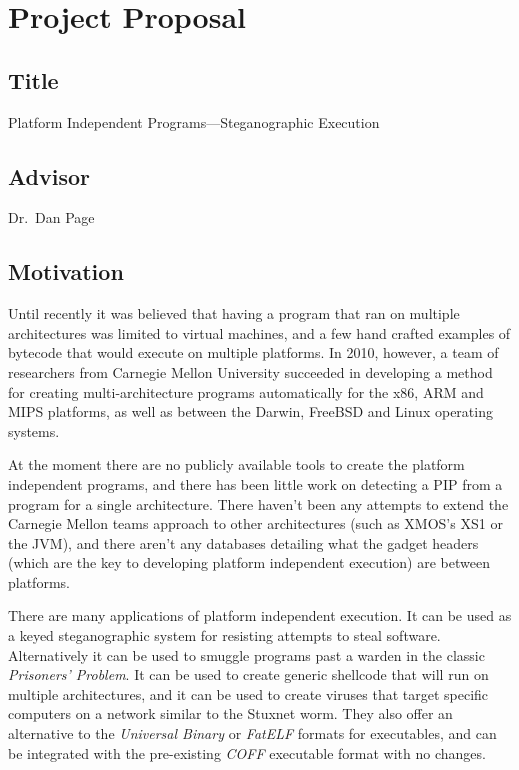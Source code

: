 \documentclass{article}
\begin{document}
\section{Project Proposal}

\subsection{Title}

Platform Independent Programs---Steganographic Execution

\subsection{Advisor}

Dr.~Dan Page

\subsection{Motivation}

Until recently it was believed that having a program that ran on
multiple architectures was limited to virtual machines, and a few hand
crafted examples of bytecode that would execute on multiple platforms.
In 2010, however, a team of researchers from Carnegie Mellon University
succeeded in developing a method for creating multi-architecture
programs automatically for the x86, ARM and MIPS platforms, as well as
between the Darwin, FreeBSD and Linux operating systems.

At the moment there are no publicly available tools to create the
platform independent programs, and there has been little work on
detecting a PIP from a program for a single architecture. There haven't
been any attempts to extend the Carnegie Mellon teams approach to other
architectures (such as XMOS's XS1 or the JVM), and there aren't any
databases detailing what the gadget headers (which are the key to
developing platform independent execution) are between platforms.

There are many applications of platform independent execution. It can be
used as a keyed steganographic system for resisting attempts to steal
software. Alternatively it can be used to smuggle programs past a warden
in the classic \emph{Prisoners' Problem}. It can be used to create
generic shellcode that will run on multiple architectures, and it can be
used to create viruses that target specific computers on a network
similar to the Stuxnet worm. They also offer an alternative to the
\emph{Universal Binary} or \emph{FatELF} formats for executables, and
can be integrated with the pre-existing \emph{COFF} executable format
with no changes.
\end{document}
